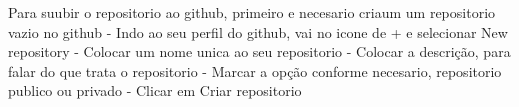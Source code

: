 Para suubir o repositorio ao github, primeiro e necesario criaum um repositorio vazio no github
 - Indo ao seu perfil do github, vai no icone de + e selecionar New repository
 - Colocar um nome unica ao seu repositorio
 - Colocar a descrição, para falar do que trata o repositorio
 - Marcar a opção conforme necesario, repositorio publico ou privado
 - Clicar em Criar repositorio

 